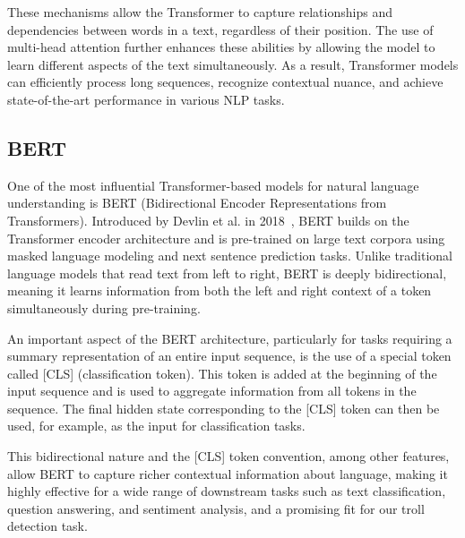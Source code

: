 \documentclass[twoside]{ctuthesis}
\theoremstyle{plain}
\theoremstyle{definition}
\theoremstyle{note}
\begin{document}
These mechanisms allow the Transformer to capture relationships and dependencies between words in a text, regardless of their position. The use of multi-head attention further enhances these abilities by allowing the model to learn different aspects of the text simultaneously. As a result, Transformer models can efficiently process long sequences, recognize contextual nuance, and achieve state-of-the-art performance in various NLP tasks.\par

\subsection{BERT}
\label{subsec:bert}
One of the most influential Transformer-based models for natural language understanding is BERT (Bidirectional Encoder Representations from Transformers). Introduced by Devlin et al. in 2018~\cite{Devlin2018}, BERT builds on the Transformer encoder architecture and is pre-trained on large text corpora using masked language modeling and next sentence prediction tasks. Unlike traditional language models that read text from left to right, BERT is deeply bidirectional, meaning it learns information from both the left and right context of a token simultaneously during pre-training.\par

An important aspect of the BERT architecture, particularly for tasks requiring a summary representation of an entire input sequence, is the use of a special token called [CLS] (classification token). This token is added at the beginning of the input sequence and is used to aggregate information from all tokens in the sequence. The final hidden state corresponding to the [CLS] token can then be used, for example, as the input for classification tasks.\par

This bidirectional nature and the [CLS] token convention, among other features, allow BERT to capture richer contextual information about language, making it highly effective for a wide range of downstream tasks such as text classification, question answering, and sentiment analysis, and a promising fit for our troll detection task.\par
\end{document}
